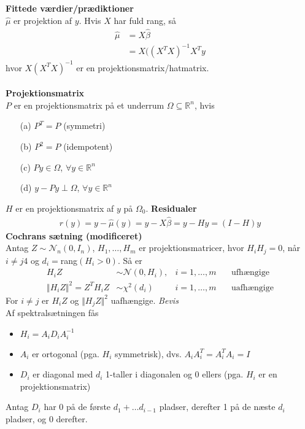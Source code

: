 \documentclass[12pt,a4paper]{report}
\author{Frederik Appel Vardinghus-Nielsen}
\begin{document}
\\\\
\textbf{Fittede værdier/prædiktioner}\\
$\hat{\mu}$ er projektion af $y$. Hvis $X$ har fuld rang, så
\begin{align*}
\hat{\mu}&=X\hat{\beta}\\
&=X((X^TX)^{-1}X^Ty
\end{align*}
hvor $X(X^TX)^{-1}$ er en projektionsmatrix/hatmatrix.\\\\
\textbf{Projektionsmatrix}\\
$P$ er en projektionsmatrix på et underrum $\Omega\subseteq\mathbb{R}^n$, hvis
\begin{itemize}
\item[(a)] $P^T=P$ (symmetri)
\item[(b)] $P^2=P$ (idempotent)
\item[(c)] $Py\in\Omega$, $\forall y\in\mathbb{R}^n$
\item[(d)] $y-Py\perp\Omega$, $\forall y\in\mathbb{R}^n$
\end{itemize}
$H$ er en projektionsmatrix af $y$ på $\Omega_0$.
\textbf{Residualer}
\begin{align*}
r(y)=y-\hat{\mu}(y)=y-X\hat{\beta}=y-Hy=(I-H)y
\end{align*}
\textbf{Cochrans sætning (modificeret)}\\
Antag $Z\sim\mathcal{N}_n(0,I_n)$, $H_1,\ldots,H_m$ er projektionsmatricer, hvor $H_iH_j=0$, når $i\neq j4$ og $d_i=$rang$(H_i>0)$. Så er 
\begin{align*}
H_iZ&\sim\mathcal{N}(0,H_i),&i=1,\ldots,m\phantom{mm}\text{ufhængige}\\
\Vert H_iZ\Vert^2=Z^TH_iZ&\sim\chi^2(d_i)&i=1,\ldots,m\phantom{mm}\text{uafhængige}
\end{align*}
For $i\neq j$ er $H_iZ$ og $\Vert H_jZ\Vert^2$ uafhængige.
\textit{Bevis}\\
Af spektralsætningen fås
\begin{itemize}
\item $H_i=A_iD_iA_i^{-1}$
\item $A_i$ er ortogonal (pga. $H_i$ symmetrisk), dvs. $A_iA_i^T=A_i^TA_i=I$
\item $D_i$ er diagonal med $d_i$ 1-taller i diagonalen og 0 ellers (pga. $H_i$ er en projektionsmatrix)
\end{itemize}
Antag $D_i$ har 0 på de første $d_1+\ldots d_{i-1}$ pladser, derefter 1 på de næste $d_i$ pladser, og 0 derefter.\\
\end{document}
